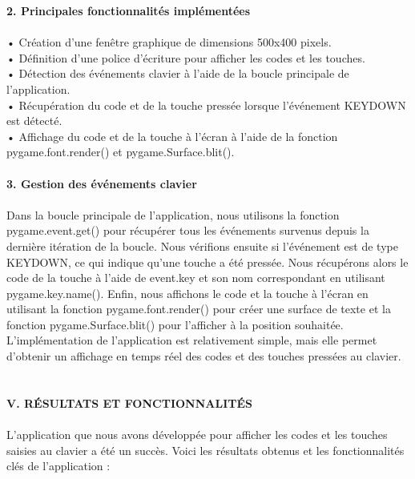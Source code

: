 \documentclass[a4paper, 12px]{article}
\begin{document}
{\bfseries 2. Principales fonctionnalités implémentées }\\
\\
•	Création d'une fenêtre graphique de dimensions 500x400 pixels.\\
•	Définition d'une police d'écriture pour afficher les codes et les touches.\\
•	Détection des événements clavier à l'aide de la boucle principale de l'application.\\
•	Récupération du code et de la touche pressée lorsque l'événement KEYDOWN est détecté.\\
•	Affichage du code et de la touche à l'écran à l'aide de la fonction pygame.font.render() et pygame.Surface.blit().\\
\\
{\bfseries 3. Gestion des événements clavier }\\
\\
Dans la boucle principale de l'application, nous utilisons la fonction pygame.event.get() pour récupérer tous les événements survenus depuis la dernière itération de la boucle. Nous vérifions ensuite si l'événement est de type KEYDOWN, ce qui indique qu'une touche a été pressée. Nous récupérons alors le code de la touche à l'aide de event.key et son nom correspondant en utilisant pygame.key.name(). Enfin, nous affichons le code et la touche à l'écran en utilisant la fonction pygame.font.render() pour créer une surface de texte et la fonction pygame.Surface.blit() pour l'afficher à la position souhaitée.
L'implémentation de l'application est relativement simple, mais elle permet d'obtenir un affichage en temps réel des codes et des touches pressées au clavier.
\\
\\
\\
{\bfseries \MakeUppercase{V. Résultats et fonctionnalités}}\\
\\
L'application que nous avons développée pour afficher les codes et les touches saisies au clavier a été un succès. Voici les résultats obtenus et les fonctionnalités clés de l'application :\\
\end{document}
